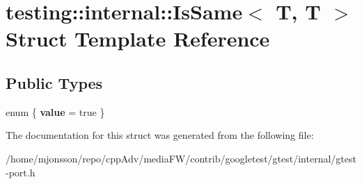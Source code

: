 \hypertarget{structtesting_1_1internal_1_1IsSame_3_01T_00_01T_01_4}{}\section{testing\+:\+:internal\+:\+:Is\+Same$<$ T, T $>$ Struct Template Reference}
\label{structtesting_1_1internal_1_1IsSame_3_01T_00_01T_01_4}
\subsection*{Public Types}
\begin{DoxyCompactItemize}
\item 
\mbox{\label{structtesting_1_1internal_1_1IsSame_3_01T_00_01T_01_4_a4f43bdb63adfd73e0a8cace4cc6368de}} 
enum \{ {\bfseries value} = true
 \}
\end{DoxyCompactItemize}


The documentation for this struct was generated from the following file\+:\begin{DoxyCompactItemize}
\item 
/home/mjonsson/repo/cpp\+Adv/media\+F\+W/contrib/googletest/gtest/internal/gtest-\/port.\+h\end{DoxyCompactItemize}

